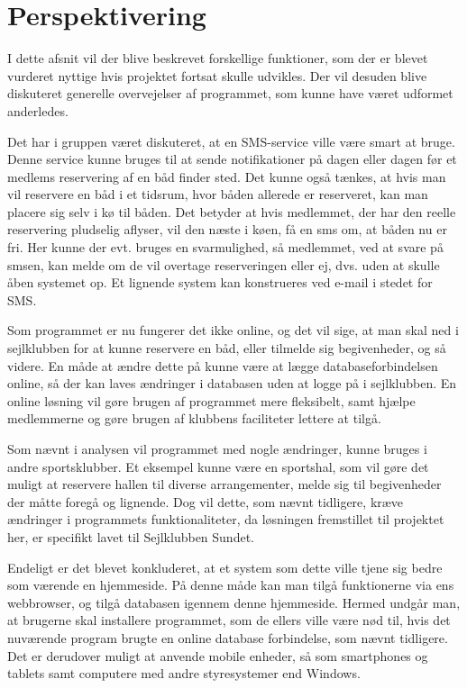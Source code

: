 \chapter{Perspektivering}

I dette afsnit vil der blive beskrevet forskellige funktioner, som der er blevet vurderet nyttige hvis projektet fortsat skulle udvikles. 
Der vil desuden blive diskuteret generelle overvejelser af programmet, som kunne have været udformet anderledes. 

Det har i gruppen været diskuteret, at en SMS-service ville være smart at bruge. 
Denne service kunne bruges til at sende notifikationer på dagen eller dagen før et medlems reservering af en båd finder sted. 
Det kunne også tænkes, at hvis man vil reservere en båd i et tidsrum, hvor båden allerede er reserveret, kan man placere sig selv i kø til båden.
Det betyder at hvis medlemmet, der har den reelle reservering pludselig aflyser, vil den næste i køen, få en sms om, at båden nu er fri.
Her kunne der evt. bruges en svarmulighed, så medlemmet, ved at svare på smsen, kan melde om de vil overtage reserveringen eller ej, dvs. uden at skulle åben systemet op. 
Et lignende system kan konstrueres ved e-mail i stedet for SMS.

Som programmet er nu fungerer det ikke online, og det vil sige, at man skal ned i sejlklubben for at kunne reservere en båd, eller tilmelde sig begivenheder, og så videre. 
En måde at ændre dette på kunne være at lægge databaseforbindelsen online, så der kan laves ændringer i databasen uden at logge på i sejlklubben. 
En online løsning vil gøre brugen af programmet mere fleksibelt, samt hjælpe medlemmerne og gøre brugen af klubbens faciliteter lettere at tilgå.

Som nævnt i analysen vil programmet med nogle ændringer, kunne bruges i andre sportsklubber. 
Et eksempel kunne være en sportshal, som vil gøre det muligt at reservere hallen til diverse arrangementer, melde sig til begivenheder der måtte foregå og lignende. 
Dog vil dette, som nævnt tidligere, kræve ændringer i programmets funktionaliteter, da løsningen fremstillet til projektet her, er specifikt lavet til Sejlklubben Sundet.

Endeligt er det blevet konkluderet, at et system som dette ville tjene sig bedre som værende en hjemmeside.
På denne måde kan man tilgå funktionerne via ens webbrowser, og tilgå databasen igennem denne hjemmeside. 
Hermed undgår man, at brugerne skal installere programmet, som de ellers ville være nød til, hvis det nuværende program brugte en online database forbindelse, som nævnt tidligere. 
Det er derudover muligt at anvende mobile enheder, så som smartphones og tablets samt computere med andre styresystemer end Windows.
